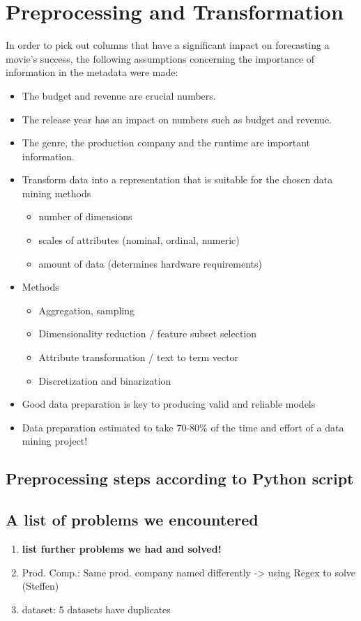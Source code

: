 \chapter{Preprocessing and Transformation}
\label{cha:preprocessing_transformation}

In order to pick out columns that have a significant impact on forecasting a movie's success, the following assumptions concerning the importance of information in the metadata were made:
\begin{itemize}
	\item The budget and revenue are crucial numbers.
	\item The release year has an impact on numbers such as budget and revenue.
	\item The genre, the production company and the runtime are important information.
\end{itemize}

\begin{itemize}
	\item Transform data into a representation that is suitable for the chosen data mining methods
	\begin{itemize}
		\item number of dimensions
		\item scales of attributes (nominal, ordinal, numeric)
		\item amount of data (determines hardware requirements)
	\end{itemize}
	\item Methods
	\begin{itemize}
		\item Aggregation, sampling
		\item Dimensionality reduction / feature subset selection
		\item Attribute transformation / text to term vector
		\item Discretization and binarization
	\end{itemize}
	\item Good data preparation is key to producing valid and reliable models
	\item Data preparation estimated to take 70-80\% of the time and effort of a data mining project!
\end{itemize}


\section{Preprocessing steps according to Python script}

\section{A list of problems we encountered}
\begin{enumerate}
	\item \textbf{list further problems we had and solved!}
	\item Prod. Comp.: Same prod. company named differently -> using Regex to solve (Steffen)
	\item dataset: 5 datasets have duplicates
\end{enumerate}
